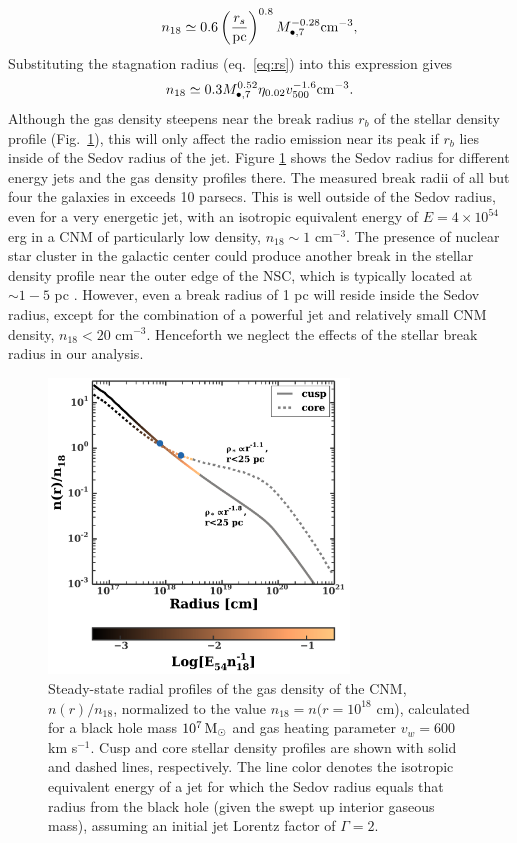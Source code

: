 \documentclass[usenatbib,fleqn]{mnras}
\newcommand{\Mbh}[1][]{M_{\bullet#1}}
\newcommand{\Msun}{{\rm M_\odot}}
\begin{document}
\begin{equation}
  n_{18}\simeq 0.6 \left(\frac{r_s}{\rm pc}\right)^{0.8}
  \Mbh[,7]^{-0.28} {\rm cm^{-3}},
  \label{eq:n18}
\end{equation}
%
Substituting the stagnation radius (eq.~\ref{eq:rs}) into this
expression gives
\begin{equation}
n_{18}\simeq 0.3 \Mbh[,7]^{0.52} \eta_{0.02} v_{500}^{-1.6} {\rm
  cm^{-3}}.
\label{eq:n182}
\end{equation} 
%
Although the gas density steepens near the break radius $r_b$ of the
stellar density profile (Fig.~\ref{fig:profiles}), this will only
affect the radio emission near its peak if $r_b$ lies inside of the
Sedov radius of the jet.  Figure \ref{fig:profiles} shows the Sedov
radius for different energy jets and the gas density profiles there.
The measured break radii of all but four the galaxies in
\citet{Lauer+2007} exceeds 10 parsecs.  This is well outside of the
Sedov radius, even for a very energetic jet, with an isotropic
equivalent energy of $E=4\times 10^{54}$ erg in a CNM of particularly
low density, $n_{18} \sim 1$ cm$^{-3}$.  The presence of nuclear star
cluster in the galactic center could produce another break in the
stellar density profile near the outer edge of the NSC, which is
typically located at $\sim 1-5$ pc \citep{Georgiev+2014}.  However,
even a break radius of 1 pc will reside inside the Sedov radius,
except for the combination of a powerful jet and relatively small CNM
density, $n_{18}<20$ cm$^{-3}$.  Henceforth we neglect the effects of
the stellar break radius in our analysis.


\begin{figure}
\includegraphics[width=8cm]{sedov_radius.pdf}
\caption{\label{fig:profiles} Steady-state radial profiles of the gas
  density of the CNM, $n(r)/n_{18}$, normalized to the value $n_{18} =
  n(r = 10^{18}$ cm), calculated for a black hole mass $10^{7}
  \,\Msun$ and gas heating parameter $v_w=600$ km s$^{-1}$.  Cusp and
  core stellar density profiles are shown with solid and dashed lines,
  respectively.  The line color denotes the isotropic equivalent
  energy of a jet for which the Sedov radius equals that radius from
  the black hole (given the swept up interior gaseous mass), assuming
  an initial jet Lorentz factor of $\Gamma=2$.}
\end{figure}
\end{document}
